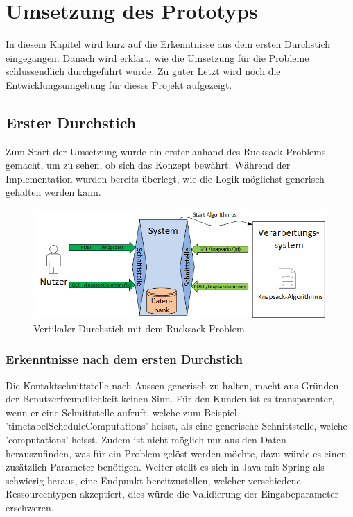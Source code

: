 %
%

\chapter{Umsetzung des Prototyps \resultAssignment{[R5]}}\label{chap.umsetzung}
In diesem Kapitel wird kurz auf die Erkenntnisse aus dem ersten Durchstich eingegangen. Danach wird erklärt, wie die Umsetzung für die Probleme schlussendlich durchgeführt wurde. Zu guter 
Letzt wird noch die Entwicklungsumgebung für dieses Projekt aufgezeigt.

\section{Erster Durchstich}\label{entwicklungsumgebung}
Zum Start der Umsetzung wurde ein erster  anhand des Rucksack Problems gemacht, um zu sehen, ob sich das Konzept bewährt. Während der 
Implementation wurden bereits überlegt, wie die Logik möglichst generisch gehalten werden kann.

\begin{figure}[h]
\centering
\includegraphics[scale=0.8]{images/visio/prototype_knapsack.png}
\caption[Vertikaler Durchstich mit dem Rucksack Problem]{Vertikaler Durchstich mit dem Rucksack Problem \selfmade{}}
\label{fig:prototyp_knapsack}
\end{figure}

\subsection{Erkenntnisse nach dem ersten Durchstich}\label{learning_prototyp}
Die Kontaktschnittstelle nach Aussen generisch zu halten, macht aus Gründen der Benutzerfreundlichkeit keinen Sinn. Für den Kunden ist es transparenter, wenn er eine Schnittstelle aufruft, 
welche zum Beispiel 'timetabelScheduleComputations' heisst, als eine generische Schnittstelle, welche 'computations' heisst. Zudem ist nicht möglich nur aus den Daten herauszufinden, was für 
ein Problem gelöst werden möchte, dazu würde es einen zusätzlich Parameter benötigen. Weiter stellt es sich in Java mit Spring als schwierig heraus, eine Endpunkt bereitzustellen, welcher 
verschiedene Ressourcentypen akzeptiert, dies würde die Validierung der Eingabeparameter erschweren.

